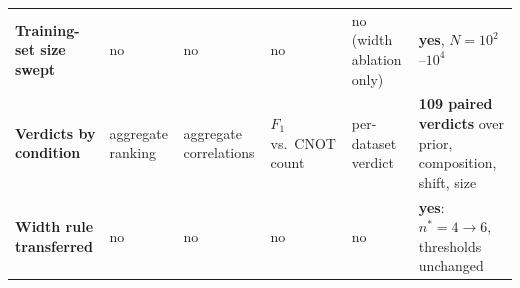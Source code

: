 \begin{table}[t]
\begin{tabular}{@{}l p{2.05cm} p{2.05cm} p{2.05cm} p{2.35cm} p{2.6cm}@{}}
\midrule
\textbf{Training-set size swept} & no & no                & no                 & no (width ablation only) & \textbf{yes}, $N=10^2$--$10^4$ \\
\textbf{Verdicts by condition} & aggregate ranking & aggregate correlations & $F_1$ vs.\ CNOT count & per-dataset verdict & \textbf{109 paired verdicts} over prior, composition, shift, size \\
\textbf{Width rule transferred} & no & no & no            & no                 & \textbf{yes}: $n^\ast=4\to6$, thresholds unchanged \\
\bottomrule
\end{tabular}
\end{table}
